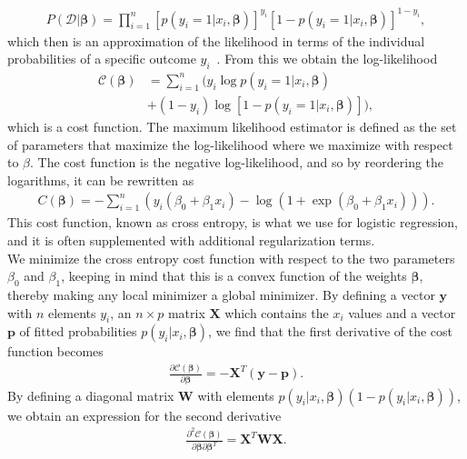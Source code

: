 \documentclass[english,notitlepage,reprint,nofootinbib]{revtex4-2}  %
\begin{document}
\begin{align}
    P(\mathcal{D}|\boldsymbol{\beta}) 
    = \prod\limits_{i=1}^n 
    [p(y_i=1|x_i,\boldsymbol{\beta})]^{y_i}
    [1 - p(y_i=1|x_i,\boldsymbol{\beta})]^{1-y_i}, 
\end{align}
which then is an approximation of the likelihood in terms of the individual probabilities of a specific outcome $y_i$~\cite{lecture_notes}. 
From this we obtain the log-likelihood
\begin{align}
    \mathcal{C}(\boldsymbol{\beta}) 
    &= \sum\limits_{i=1}^n (y_i 
    \log p(y_i=1|x_i,\boldsymbol{\beta}) \nonumber \\ 
    &+ (1-y_i) 
    \log[1 - p(y_i=1|x_i,\boldsymbol{\beta})]), 
\end{align}
which is a cost function. 
The maximum likelihood estimator is defined as the set of parameters that maximize the log-likelihood where we maximize with respect to $\beta$. The cost function is the negative log-likelihood, and so by reordering the logarithms, it can be rewritten as 
\begin{align}\label{eq: cost function logistic regression}
    C(\boldsymbol{\beta}) = -\sum\limits_{i=1}^n (y_i(\beta_0 + \beta_1 x_i) - \log(1+\exp(\beta_0 + \beta_1 x_i))).
\end{align}
This cost function, known as cross entropy, is what we use for logistic regression, and it is often supplemented with additional regularization terms. 
\vspace{3mm}
\\ 
We minimize the cross entropy cost function with respect to the two parameters $\beta_0$ and $\beta_1$, keeping in mind that this is a convex function of the weights $\boldsymbol{\beta}$, thereby making any local minimizer a global minimizer. By defining a vector $\boldsymbol{y}$ with $n$ elements $y_i$, an $n\times p$ matrix $\mathbf{X}$ which contains the $x_i$ values and a vector $\boldsymbol{p}$ of fitted probabilities $p(y_i | x_i, \boldsymbol{\beta})$, we find that the first derivative of the cost function becomes 
\begin{align}
    \frac{\partial \mathcal{C}(\boldsymbol{\beta})}{\partial \boldsymbol{\beta}} = -\boldsymbol{X}^T\left(\boldsymbol{y}-\boldsymbol{p}\right).
\end{align}
By defining a diagonal matrix $\mathbf{W}$ with elements $p(y_i | x_i, \boldsymbol{\beta})(1 - p(y_i | x_i, \boldsymbol{\beta}))$, we obtain an expression for the second derivative 
\begin{align}
    \frac{\partial^2 \mathcal{C}(\boldsymbol{\beta})}{\partial \boldsymbol{\beta}\partial \boldsymbol{\beta}^T} = \boldsymbol{X}^T\boldsymbol{W}\boldsymbol{X}.
\end{align}
\end{document}
